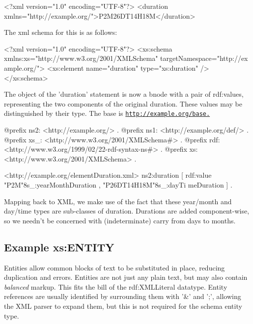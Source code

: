 \begin{DoxyCodeInclude}
<?xml version="1.0" encoding="UTF-8"?>
<duration xmlns="http://example.org/">P2M26DT14H18M</duration>
\end{DoxyCodeInclude}


The xml schema for this is as follows:


\begin{DoxyCodeInclude}
<?xml version="1.0" encoding="UTF-8"?>
<xs:schema xmlns:xs="http://www.w3.org/2001/XMLSchema" targetNamespace="http://ex
      ample.org/">
        <xs:element name="duration" type="xs:duration" />
</xs:schema>
\end{DoxyCodeInclude}


The object of the 'duration' statement is now a bnode with a pair of rdf:values, representing the two components of the original duration. These values may be distinguished by their type. The base is \href{http://example.org/base.}{\tt http://example.org/base.}


\begin{DoxyCodeInclude}
@prefix ns2:     <http://example.org/> .
@prefix ns1:     <http://example.org/def/> .
@prefix xs_:     <http://www.w3.org/2001/XMLSchema#> .
@prefix rdf:     <http://www.w3.org/1999/02/22-rdf-syntax-ns#> .
@prefix xs:      <http://www.w3.org/2001/XMLSchema> .

<http://example.org/elementDuration.xml>
      ns2:duration
              [ rdf:value "P2M"^^xs_:yearMonthDuration , "P26DT14H18M"^^xs_:dayTi
      meDuration
              ] .
\end{DoxyCodeInclude}


Mapping back to XML, we make use of the fact that these year/month and day/time types are sub-\/classes of duration. Durations are added component-\/wise, so we needn't be concerned with (indeterminate) carry from days to months. \hypertarget{elementENTITY}{}\subsection{Example xs:ENTITY}\label{elementENTITY}
Entities allow common blocks of text to be substituted in place, reducing duplication and errors. Entities are not just any plain text, but may also contain {\itshape balanced\/} markup. This fits the bill of the rdf:XMLLiteral datatype. Entity references are usually identified by surrounding them with '\&' and ';', allowing the XML parser to expand them, but this is not required for the schema entity type.


